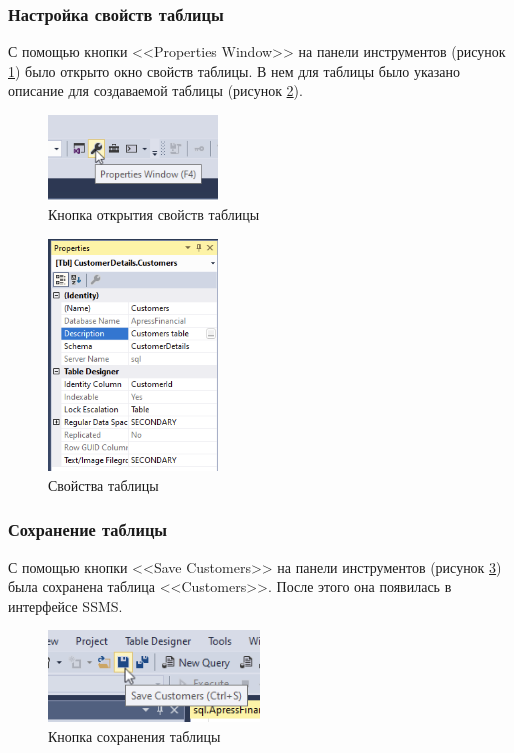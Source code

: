 \documentclass[a4paper, 14pt]{extarticle}
\begin{document}
\subsubsection{Настройка свойств таблицы}

С помощью кнопки <<Properties Window>> на панели инструментов (рисунок
\ref{fig:task-1-8}) было открыто окно свойств таблицы. В нем для таблицы было
указано описание для создаваемой таблицы (рисунок \ref{fig:task-1-9}).

\begin{figure}[H]
  \centering
  \includegraphics[width=0.4\textwidth]{images/task-1/8.png}
  \caption{Кнопка открытия свойств таблицы}
  \label{fig:task-1-8}
\end{figure}

\begin{figure}[H]
  \centering
  \includegraphics[width=0.4\textwidth]{images/task-1/9.png}
  \caption{Свойства таблицы}
  \label{fig:task-1-9}
\end{figure}

\subsubsection{Сохранение таблицы}

С помощью кнопки <<Save Customers>> на панели инструментов (рисунок
\ref{fig:task-1-10}) была сохранена таблица <<Customers>>. После этого она
появилась в интерфейсе SSMS.

\begin{figure}[H]
  \centering
  \includegraphics[width=0.5\textwidth]{images/task-1/10.png}
  \caption{Кнопка сохранения таблицы}
  \label{fig:task-1-10}
\end{figure}
\end{document}
